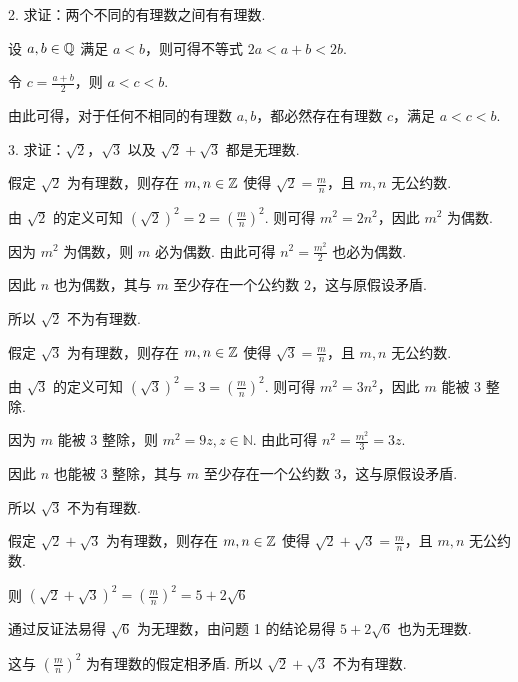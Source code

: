 \documentclass[12pt, a4paper, oneside, UTF8]{ctexbook}
\begin{document}
2. 求证：两个不同的有理数之间有有理数.

\begin{solution}
设 $a, b \in \mathbb{Q}$ 满足 $a < b$，则可得不等式 $2a < a + b < 2b$.

令 $\displaystyle c = \frac{a + b}{2}$，则 $a < c < b$.

由此可得，对于任何不相同的有理数 $a, b$，都必然存在有理数 $c$，满足 $a < c < b$.
\end{solution}

3. 求证：$\sqrt{2}$，$\sqrt{3}$ 以及 $\sqrt{2} + \sqrt{3}$ 都是无理数.

\begin{solution}
假定 $\sqrt{2}$ 为有理数，则存在 ${m, n \in \mathbb{Z}}$ 使得 $\displaystyle\sqrt{2} = \frac{m}{n}$，且 $m, n$ 无公约数.

由 $\sqrt{2}$ 的定义可知 $\displaystyle (\sqrt{2})^2 = 2 = \left(\frac{m}{n}\right)^2$. 则可得 $m^2 = 2n^2$，因此 $m^2$ 为偶数.

因为 $m^2$ 为偶数，则 $m$ 必为偶数. 由此可得 $\displaystyle n^2 = \frac{m^2}{2}$ 也必为偶数.

因此 $n$ 也为偶数，其与 $m$ 至少存在一个公约数 $2$，这与原假设矛盾.

所以 $\sqrt{2}$ 不为有理数.

\vspace{1.5em}

假定 $\sqrt{3}$ 为有理数，则存在 ${m, n \in \mathbb{Z}}$ 使得 $\displaystyle\sqrt{3} = \frac{m}{n}$，且 $m, n$ 无公约数.

由 $\sqrt{3}$ 的定义可知 $\displaystyle (\sqrt{3})^2 = 3 = \left(\frac{m}{n}\right)^2$. 则可得 $m^2 = 3n^2$，因此 $m$ 能被 $3$ 整除.

因为 $m$ 能被 $3$ 整除，则 $m^2 = 9z, z \in \mathbb{N}$. 由此可得 $\displaystyle n^2 = \frac{m^2}{3} = 3z$.

因此 $n$ 也能被 $3$ 整除，其与 $m$ 至少存在一个公约数 $3$，这与原假设矛盾.

所以 $\sqrt{3}$ 不为有理数.

\vspace{1.5em}

假定 $\sqrt{2} + \sqrt{3}$ 为有理数，则存在 ${m, n \in \mathbb{Z}}$ 使得 $\displaystyle\sqrt{2} + \sqrt{3} = \frac{m}{n}$，且 $m, n$ 无公约数.

则 $(\sqrt{2} + \sqrt{3})^2 = \left(\frac{m}{n}\right)^2 =  5 + 2\sqrt{6}$

通过反证法易得 $\sqrt{6}$ 为无理数，由问题 1 的结论易得 $5 + 2\sqrt{6}$ 也为无理数.

这与 $\displaystyle \left(\frac{m}{n}\right)^2$ 为有理数的假定相矛盾. 所以 $\sqrt{2} + \sqrt{3}$ 不为有理数.
\end{solution}
\end{document}
